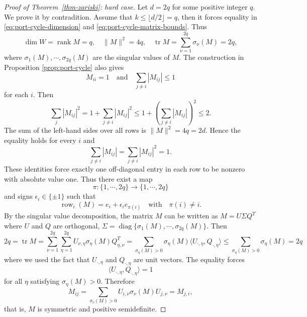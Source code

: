 \documentclass[11pt,reqno]{amsart}
\theoremstyle{definition}
\theoremstyle{plain}
\numberwithin{equation}{section}
\begin{document}
\medskip

\begin{proof}[Proof of Theorem~\ref{thm-zariski}: hard case]
    Let $d=2q$ for some positive integer $q$. We prove it by contradition. Assume that $k\le \lfloor d/2 \rfloor=q$, then it forces equality in \eqref{eq:port-cycle-dimension} and \eqref{eq:port-cycle-matrix-bounds}. Thus
    \begin{equation*}
        \dim W=\operatorname{rank}M=q,\quad \|M\|^2=4q,\quad \operatorname{tr}M=\sum_{\nu=1}^{2q} \sigma_\nu(M)=2q,
    \end{equation*}
    where $\sigma_1(M),\cdots,\sigma_{2q}(M)$ are the singular values of $M$. The construction in Proposition \ref{prop:port-cycle} also gives
    \begin{equation*}
        M_{ii}=1 \quad  \text{and}\quad \sum_{j\neq i}|M_{ij}|\le 1
    \end{equation*}
    for each $i$. Then
    \begin{equation*}
        \sum_{j}|M_{ij}|^2=1+\sum_{j\neq i}|M_{ij}|^2 \le 1+\left( \sum_{j\neq i}|M_{ij}|\right)^2\le 2.
    \end{equation*}
    The sum of the left-hand sides over all rows is $\|M\|^2=4q=2d$. Hence the equality holds for every $i$ and 
    \begin{equation*}
        \sum_{j\neq i}|M_{ij}|=\sum_{j\neq i}|M_{ij}|^2=1.
    \end{equation*}
    These identities force exactly one off-diagonal entry in each row to be nonzero with absolute value one. Thus there exist a map
    \begin{equation*}
        \pi: \lbrace 1,\cdots, 2q\rbrace\to \lbrace 1,\cdots,2q\rbrace
    \end{equation*}
    and signs $\epsilon_i\in \lbrace \pm 1\rbrace$ such that
    \begin{equation*}
        \operatorname{row}_i(M)= e_i+\epsilon_i e_{\pi(i)} \quad \text{with}\quad \pi(i)\neq i. 
    \end{equation*}
    By the singular value decomposition, the matrix $M$ can be written as $M=U\Sigma Q^T$ where $U$ and $Q$ are orthogonal, $\Sigma=\operatorname{diag}\lbrace \sigma_1(M),\cdots,\sigma_{2q}(M) \rbrace$.  Then
    \begin{equation*}
        2q=\operatorname{tr}M=\sum_{\nu=1}^{2q}\sum_{\eta=1}^{2q} U_{\nu,\eta} \sigma_\eta(M) Q^T_{\eta,\nu}= \sum_{\sigma_\eta(M)>0} \sigma_\eta (M)\langle U_{\cdot,\eta},Q_{\cdot,\eta}\rangle\le \sum_{\sigma_\eta(M)>0}\sigma_\eta(M) =2q
    \end{equation*}
    where we used the fact that $U_{\cdot,\eta}$ and $Q_{\cdot,\eta}$ are unit vectors. The equality forces
    \begin{equation*}
        \langle U_{\cdot,\eta},Q_{\cdot,\eta}\rangle=1
    \end{equation*}
    for all $\eta$ satisfying $\sigma_\eta(M)>0$. Therefore 
    \begin{equation*}
        M_{ij}=\sum_{\sigma_\nu(M)>0}U_{i,\nu}\sigma_\nu (M) U_{j,\nu}= M_{j,i},
    \end{equation*}
    that is, $M$ is symmetric and positive semidefinite.


\end{proof}
\end{document}
